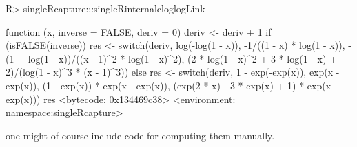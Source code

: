 \documentclass[
]{jss}
\newcommand{\1}{\mathcal{I}} \newcommand{\bx}{\boldsymbol{x}}
\begin{document}
\begin{CodeChunk}
\begin{CodeInput}
R> singleRcapture:::singleRinternalcloglogLink
\end{CodeInput}
\begin{CodeOutput}
function (x, inverse = FALSE, deriv = 0) 
{
    deriv <- deriv + 1
    if (isFALSE(inverse)) {
        res <- switch(deriv, log(-log(1 - x)), -1/((1 - x) * 
            log(1 - x)), -(1 + log(1 - x))/((x - 1)^2 * log(1 - 
            x)^2), (2 * log(1 - x)^2 + 3 * log(1 - x) + 2)/(log(1 - 
            x)^3 * (x - 1)^3))
    }
    else {
        res <- switch(deriv, 1 - exp(-exp(x)), exp(x - exp(x)), 
            (1 - exp(x)) * exp(x - exp(x)), (exp(2 * x) - 3 * 
                exp(x) + 1) * exp(x - exp(x)))
    }
    res
}
<bytecode: 0x134469c38>
<environment: namespace:singleRcapture>
\end{CodeOutput}
\end{CodeChunk}

\normalsize

one might of course include code for computing them manually.


\end{document}
